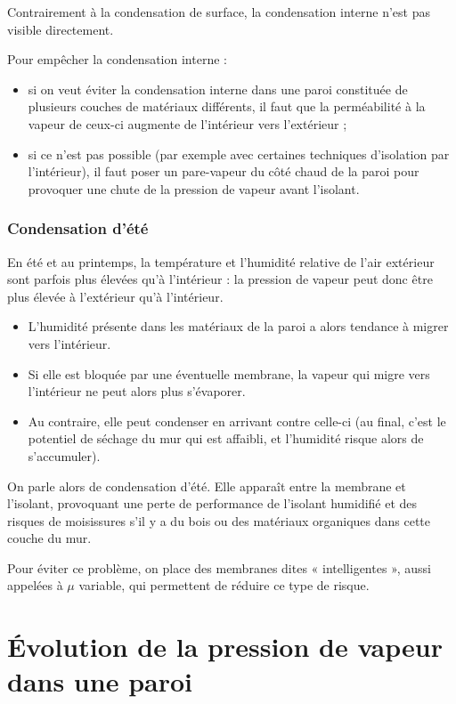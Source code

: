 Contrairement à la condensation de surface, la condensation interne n'est pas visible directement.

Pour empêcher la condensation interne :
\begin{itemize}
  \item si on veut éviter la condensation interne dans une paroi constituée de plusieurs couches de matériaux différents, il faut que la perméabilité à la vapeur de ceux-ci augmente de l'intérieur vers l'extérieur ;
  \item si ce n'est pas possible (par exemple avec certaines techniques d'isolation par l'intérieur), il faut poser un pare-vapeur du côté chaud de la paroi pour provoquer une chute de la pression de vapeur avant l'isolant.
\end{itemize}

\subsection*{Condensation d'été}
En été et au printemps, la température et l'humidité relative de l'air extérieur sont parfois plus élevées qu'à l'intérieur : la pression de vapeur peut donc être plus élevée à l'extérieur qu'à l'intérieur.
  
\begin{itemize}
  \item L'humidité présente dans les matériaux de la paroi a alors tendance à migrer vers l'intérieur.
  \item Si elle est bloquée par une éventuelle membrane, la vapeur qui migre vers l'intérieur ne peut alors plus s'évaporer.
  \item Au contraire, elle peut condenser en arrivant contre celle-ci (au final, c'est le potentiel de séchage du mur qui est affaibli, et l'humidité risque alors de s'accumuler).
\end{itemize}
On parle alors de condensation d'été. Elle apparaît entre la membrane et l'isolant, provoquant une perte de performance de l'isolant humidifié et des risques de moisissures s'il y a du bois ou des matériaux organiques dans cette couche du mur.

Pour éviter ce problème, on place des membranes dites « intelligentes », aussi appelées à $\mu$ variable, qui permettent de réduire ce type de risque.

\chapter{Évolution de la pression de vapeur dans une paroi}

